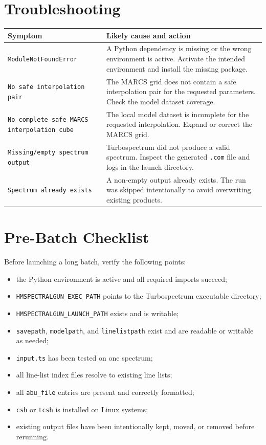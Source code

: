 \documentclass[11pt,a4paper]{article}
\newcommand{\code}[1]{\texttt{#1}}
\begin{document}
\section{Troubleshooting}

\begin{longtable}{p{}p{}}
\toprule
\textbf{Symptom} & \textbf{Likely cause and action} \\
\midrule
\code{ModuleNotFoundError} & A Python dependency is missing or the wrong environment is active. Activate the intended environment and install the missing package. \\
\code{No safe interpolation pair} & The MARCS grid does not contain a safe interpolation pair for the requested parameters. Check the model dataset coverage. \\
\code{No complete safe MARCS interpolation cube} & The local model dataset is incomplete for the requested interpolation. Expand or correct the MARCS grid. \\
\code{Missing/empty spectrum output} & Turbospectrum did not produce a valid spectrum. Inspect the generated \code{.com} file and logs in the launch directory. \\
\code{Spectrum already exists} & A non-empty output already exists. The run was skipped intentionally to avoid overwriting existing products. \\
\bottomrule
\end{longtable}

\section{Pre-Batch Checklist}

\begin{checklistbox}
Before launching a long batch, verify the following points:
\begin{itemize}
  \item the Python environment is active and all required imports succeed;
  \item \code{HMSPECTRALGUN\_EXEC\_PATH} points to the Turbospectrum executable directory;
  \item \code{HMSPECTRALGUN\_LAUNCH\_PATH} exists and is writable;
  \item \code{savepath}, \code{modelpath}, and \code{linelistpath} exist and are readable or writable as needed;
  \item \code{input.ts} has been tested on one spectrum;
  \item all line-list index files resolve to existing line lists;
  \item all \code{abu\_file} entries are present and correctly formatted;
  \item \code{csh} or \code{tcsh} is installed on Linux systems;
  \item existing output files have been intentionally kept, moved, or removed before rerunning.
\end{itemize}
\end{checklistbox}
\end{document}
